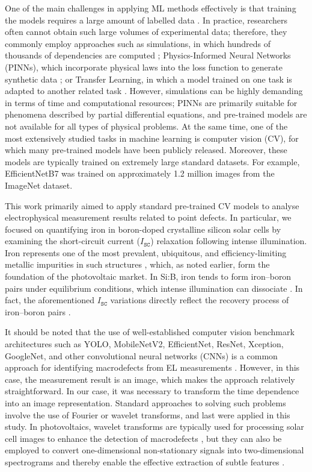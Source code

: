 \documentclass[10pt]{iopart}
\begin{document}
One of the main challenges in applying ML methods effectively is that training the models requires a large amount of labelled data \cite{Buratti2024}.
In practice, researchers often cannot obtain such large volumes of experimental data;
therefore, they commonly employ approaches such as simulations,
in which hundreds of thousands of dependencies are computed \cite{Wang2024a, Buratti2022, Buratti2020a, Olikh2025MSEB, Olikh2025SE};
Physics-Informed Neural Networks (PINNs), which incorporate physical laws into the loss function to generate synthetic data \cite{Wang2024b, Li2025};
or Transfer Learning, in which a model trained on one task is adapted to another related task \cite{Kaya2019, Kim2023}.
However, simulations can be highly demanding in terms of time and computational resources; PINNs are primarily suitable for phenomena described by partial differential equations, and pre-trained models are not available for all types of physical problems.
At the same time, one of the most extensively studied tasks in machine learning is computer vision (CV),
for which many pre-trained models have been publicly released.
Moreover, these models are typically trained on extremely large standard datasets.
For example, EfficientNetB7 was trained on approximately 1.2 million images from the ImageNet dataset.

This work primarily aimed to apply standard pre-trained CV models to analyse electrophysical measurement results related to point defects.
In particular, we focused on quantifying iron in boron-doped crystalline silicon solar cells by examining the short-circuit current
($I_\mathtt{SC}$) relaxation following intense illumination.
Iron represents one of the most prevalent, ubiquitous, and efficiency-limiting metallic impurities in such structures \cite{Buonassisi2006, IronSC},
which, as noted earlier, form the foundation of the photovoltaic market.
In Si:B, iron tends to form iron–boron pairs under equilibrium conditions, which intense illumination can dissociate \cite{Kimerling1983, FeBAssJAP2014}.
In fact, the aforementioned $I_\mathtt{SC}$ variations directly reflect the recovery process of iron–boron pairs \cite{Olikh2021JAP}.


It should be noted that the use of well-established computer vision benchmark architectures such
as YOLO, MobileNetV2, EfficientNet, ResNet, Xception, GoogleNet, and other convolutional neural networks (CNNs) is a common approach for identifying macrodefects from EL
measurements \cite{Liu2024a, Li2024a, Jia2024, Otamendi2021, Chen2022, AlOtum2024, Abdelsattar2025, tella2025}.
However, in this case, the measurement result is an image, which makes the approach relatively straightforward.
In our case, it was necessary to transform the time dependence into an image representation.
Standard approaches to solving such problems involve the use of Fourier or wavelet transforms, and last were applied in this study.
In photovoltaics, wavelet transforms are typically used for processing solar cell images to enhance the detection of
macrodefects \cite{Li2012, Rosa2024}, but they can also be employed to convert one-dimensional non-stationary signals into two-dimensional spectrograms and thereby enable the effective extraction of subtle features \cite{Vinit2020}.
\end{document}
